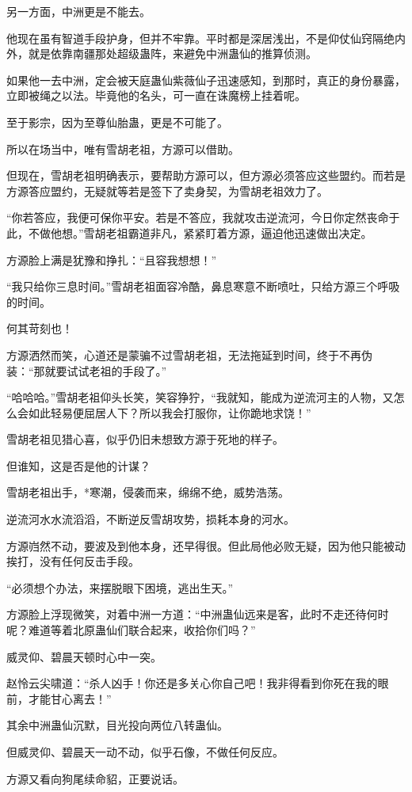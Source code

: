 \begin{this_body}
另一方面，中洲更是不能去。

他现在虽有智道手段护身，但并不牢靠。平时都是深居浅出，不是仰仗仙窍隔绝内外，就是依靠南疆那处超级蛊阵，来避免中洲蛊仙的推算侦测。

如果他一去中洲，定会被天庭蛊仙紫薇仙子迅速感知，到那时，真正的身份暴露，立即被绳之以法。毕竟他的名头，可一直在诛魔榜上挂着呢。

至于影宗，因为至尊仙胎蛊，更是不可能了。

所以在场当中，唯有雪胡老祖，方源可以借助。

但现在，雪胡老祖明确表示，要帮助方源可以，但方源必须答应这些盟约。而若是方源答应盟约，无疑就等若是签下了卖身契，为雪胡老祖效力了。

“你若答应，我便可保你平安。若是不答应，我就攻击逆流河，今日你定然丧命于此，不做他想。”雪胡老祖霸道非凡，紧紧盯着方源，逼迫他迅速做出决定。

方源脸上满是犹豫和挣扎：“且容我想想！”

“我只给你三息时间。”雪胡老祖面容冷酷，鼻息寒意不断喷吐，只给方源三个呼吸的时间。

何其苛刻也！

方源洒然而笑，心道还是蒙骗不过雪胡老祖，无法拖延到时间，终于不再伪装：“那就要试试老祖的手段了。”

“哈哈哈。”雪胡老祖仰头长笑，笑容狰狞，“我就知，能成为逆流河主的人物，又怎么会如此轻易便屈居人下？所以我会打服你，让你跪地求饶！”

雪胡老祖见猎心喜，似乎仍旧未想致方源于死地的样子。

但谁知，这是否是他的计谋？

雪胡老祖出手，*寒潮，侵袭而来，绵绵不绝，威势浩荡。

逆流河水水流滔滔，不断逆反雪胡攻势，损耗本身的河水。

方源岿然不动，要波及到他本身，还早得很。但此局他必败无疑，因为他只能被动挨打，没有任何反击手段。

“必须想个办法，来摆脱眼下困境，逃出生天。”

方源脸上浮现微笑，对着中洲一方道：“中洲蛊仙远来是客，此时不走还待何时呢？难道等着北原蛊仙们联合起来，收拾你们吗？”

威灵仰、碧晨天顿时心中一突。

赵怜云尖啸道：“杀人凶手！你还是多关心你自己吧！我非得看到你死在我的眼前，才能甘心离去！”

其余中洲蛊仙沉默，目光投向两位八转蛊仙。

但威灵仰、碧晨天一动不动，似乎石像，不做任何反应。

方源又看向狗尾续命貂，正要说话。


\end{this_body}
